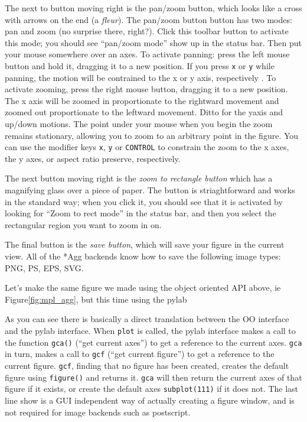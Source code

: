 The next to button moving right is the pan/zoom button, which looks
like a cross with arrows on the end (a \textit{fleur}). The pan/zoom
button button has two modes: pan and zoom (no surprise there, right?).
Click this toolbar button to activate this mode; you should see {}``pan/zoom
mode'' show up in the status bar. Then put your mouse somewhere over
an axes. To activate panning: press the left mouse button and hold
it, dragging it to a new position. If you press \texttt{x} or \texttt{y}
while panning, the motion will be contrained to the x or y axis, respectively
. To activate zooming, press the right mouse button, dragging it to
a new position. The x axis will be zoomed in proportionate to the
rightward movement and zoomed out proportionate to the leftward movement.
Ditto for the yaxis and up/down motions. The point under your mouse
when you begin the zoom remains stationary, allowing you to zoom to
an arbitrary point in the figure. You can use the modifier keys \texttt{x},
\texttt{y} or \texttt{CONTROL} to constrain the zoom to the x axes,
the y axes, or aspect ratio preserve, respectively.

The next button moving right is the \textit{zoom to rectangle button}
which has a magnifying glass over a piece of paper. The button is
striaghtforward and works in the standard way; when you click it,
you should see that it is activated by looking for {}``Zoom to rect
mode'' in the status bar, and then you select the rectangular region
you want to zoom in on.

The final button is the \textit{save button}, which will save your
figure in the current view. All of the {*}Agg backends know how to
save the following image types: PNG, PS, EPS, SVG. 

Let's make the same figure we made using the object oriented API above,
ie Figure\ref{fig:mpl_agg}, but this time using the pylab

As you can see there is basically a direct translation between the
OO interface and the pylab interface. When \texttt{plot} is called,
the pylab interface makes a call to the function \texttt{gca()} (``get
current axes'') to get a reference to the current axes. \texttt{gca}
in turn, makes a call to \texttt{gcf} ({}``get current figure'')
to get a reference to the current figure. \texttt{gcf}, finding that
no figure has been created, creates the default figure using \texttt{figure()}
and returns it. \texttt{gca} will then return the current axes of
that figure if it exists, or create the default axes \texttt{subplot(111)}
if it does not. The last line show is a GUI independent way of actually
creating a figure window, and is not required for image backends such
as postscript.

